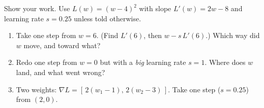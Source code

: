 \documentclass[10pt]{article}
\begin{document}
\begin{practicebox}
Show your work. Use $L(w)=(w-4)^2$ with slope $L'(w)=2w-8$ and learning rate $s=0.25$ unless told otherwise.
\begin{enumerate}[leftmargin=1.6em, itemsep=4pt]
  \item Take one step from $w=6$. (Find $L'(6)$, then $w-s\,L'(6)$.) Which way did $w$ move, and toward what? \writeline
  \item Redo one step from $w=0$ but with a \emph{big} learning rate $s=1$. Where does $w$ land, and what went wrong? \writeline
  \item Two weights: $\nabla L=[\,2(w_1-1),\,2(w_2-3)\,]$. Take one step ($s=0.25$) from $(2,0)$. \writeline
\end{enumerate}
\end{practicebox}
\end{document}
